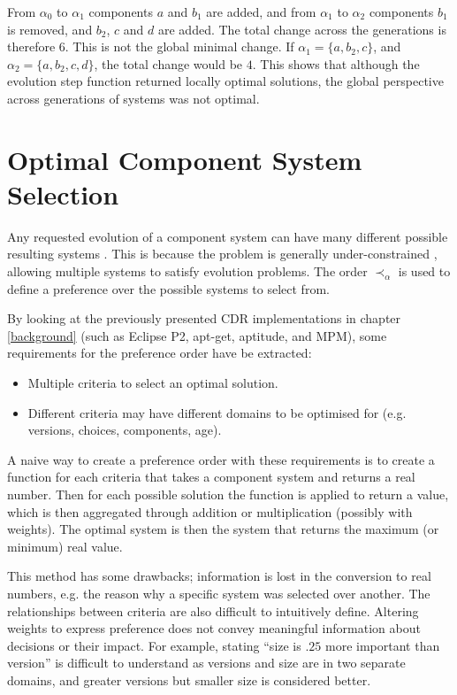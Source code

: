 From $\alpha_0$ to $\alpha_1$ components $a$ and $b_1$ are added, 
and from $\alpha_1$ to $\alpha_2$ components $b_1$ is removed, and $b_2$, $c$ and $d$ are added.
The total change across the generations is therefore $6$.
This is not the global minimal change.
If $\alpha_1 = \{a,b_2,c\}$, and $\alpha_2 = \{a,b_2,c,d\}$, the total change would be $4$.
This shows that although the evolution step function returned locally optimal solutions,
the global perspective across generations of systems was not optimal.

\section{Optimal Component System Selection}
\label{formal.opt}
Any requested evolution of a component system can have many different possible resulting systems \citep{leBerre2010}.
This is because the problem is generally under-constrained \citep{Berre2008}, allowing multiple systems to satisfy evolution problems.
The order $\prec_{\alpha}$ is used to define a preference over the possible systems to select from.

By looking at the previously presented CDR implementations in chapter \ref{background} (such as Eclipse P2, apt-get, aptitude, and MPM), some requirements for the preference order have be extracted:
\begin{itemize}
  \item Multiple criteria to select an optimal solution.
  \item Different criteria may have different domains to be optimised for (e.g. versions, choices, components, age).
\end{itemize} 

A naive way to create a preference order with these requirements is to create a function for each criteria that takes a component system and returns a real number.
Then for each possible solution the function is applied to return a value, which is then aggregated through addition or multiplication (possibly with weights).
The optimal system is then the system that returns the maximum (or minimum) real value. 

This method has some drawbacks; information is lost in the conversion to real numbers, e.g. the reason why a specific system was selected over another.
The relationships between criteria are also difficult to intuitively define.
Altering weights to express preference does not convey meaningful information about decisions or their impact.
For example, stating ``size is $.25$ more important than version'' is difficult to understand as versions and size are in two separate domains, 
and greater versions but smaller size is considered better.

